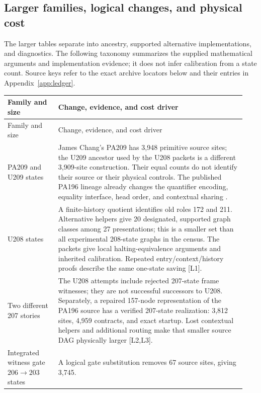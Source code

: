 \subsection{Larger families, logical changes, and physical cost}

The larger tables separate into ancestry, supported alternative
implementations, and diagnostics. The following taxonomy summarizes the
supplied mathematical arguments and implementation evidence; it does not
infer calibration from a state count. Source keys refer to the exact
archive locators below and their entries in Appendix~\ref{app:ledger}.

{\small
\begin{longtable}{@{}p{0.20\linewidth}p{0.74\linewidth}@{}}
\toprule
Family and size & Change, evidence, and cost driver\\
\midrule
\endfirsthead
\toprule
Family and size & Change, evidence, and cost driver\\
\midrule
\endhead
\bottomrule
\endfoot
PA209 and U209\newline 209 states &
James Chang's PA209 has 3,948 primitive source sites; the U209 ancestor
used by the U208 packets is a different 3,909-site construction.
Their equal counts do not identify their source or their physical
controls. The published PA196 lineage already changes the quantifier
encoding, equality interface, head order, and contextual sharing
\cite{upstream,pa194}.\\[4pt]
U208\newline 208 states &
A finite-history quotient identifies old roles 172 and 211. Alternative
helpers give 20 designated, supported graph classes among 27 presentations;
this is a smaller set than all experimental 208-state graphs in the census.
The packets give local halting-equivalence arguments and inherited
calibration. Repeated entry/context/history proofs describe the same
one-state saving [L1].\\[4pt]
Two different 207 stories &
The U208 attempts include rejected 207-state frame witnesses; they are
not successful successors to U208. Separately, a repaired 157-node
representation of the PA196 source has a verified 207-state realization:
3,812 sites, 4,959 contracts, and exact startup. Lost contextual helpers
and additional routing make that smaller source DAG physically larger
[L2,L3].\\[4pt]
Integrated witness gate\newline $206\to203$ states &
A logical gate substitution removes 67 source sites, giving 3,745.

\end{longtable}}
